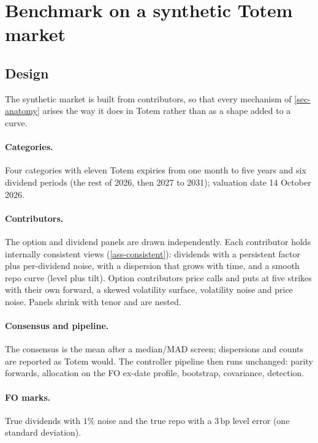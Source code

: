 \section{Benchmark on a synthetic Totem market}\label{sec-benchmark}

\subsection{Design}
The synthetic market is built from contributors, so that every mechanism of \cref{sec-anatomy} arises the way it
does in Totem rather than as a shape added to a curve.

\paragraph{Categories.} Four categories with eleven Totem expiries from one month to five years and six dividend
periods (the rest of 2026, then 2027 to 2031); valuation date 14 October 2026.
\begin{center}\end{center}

\paragraph{Contributors.} The option and dividend panels are drawn independently. Each contributor holds
internally consistent views (\cref{ass-consistent}): dividends with a persistent factor plus per-dividend noise, with a
dispersion that grows with time, and a smooth repo curve (level plus tilt). Option contributors price calls and puts at
five strikes with their own forward, a skewed volatility surface, volatility noise and price noise. Panels shrink with
tenor and are nested.

\paragraph{Consensus and pipeline.} The consensus is the mean after a median/MAD screen; dispersions and counts are
reported as Totem would. The controller pipeline then runs unchanged: parity forwards, allocation on the FO ex-date
profile, bootstrap, covariance, detection.

\paragraph{FO marks.} True dividends with $1\%$ noise and the true repo with a $3$\,bp level error (one standard
deviation).

